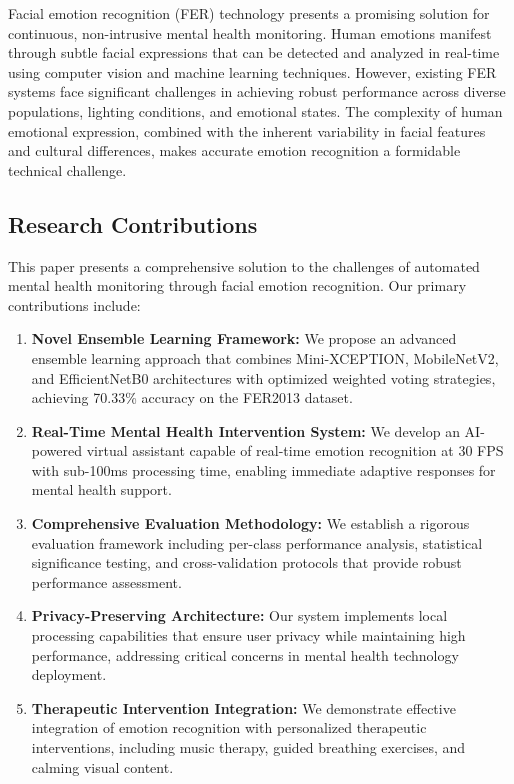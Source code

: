 \documentclass[conference]{IEEEtran}
\begin{document}
Facial emotion recognition (FER) technology presents a promising solution for continuous, non-intrusive mental health monitoring. Human emotions manifest through subtle facial expressions that can be detected and analyzed in real-time using computer vision and machine learning techniques. However, existing FER systems face significant challenges in achieving robust performance across diverse populations, lighting conditions, and emotional states. The complexity of human emotional expression, combined with the inherent variability in facial features and cultural differences, makes accurate emotion recognition a formidable technical challenge.

\subsection{Research Contributions}
This paper presents a comprehensive solution to the challenges of automated mental health monitoring through facial emotion recognition. Our primary contributions include:

\begin{enumerate}
    \item \textbf{Novel Ensemble Learning Framework:} We propose an advanced ensemble learning approach that combines Mini-XCEPTION, MobileNetV2, and EfficientNetB0 architectures with optimized weighted voting strategies, achieving 70.33\% accuracy on the FER2013 dataset.

    \item \textbf{Real-Time Mental Health Intervention System:} We develop an AI-powered virtual assistant capable of real-time emotion recognition at 30 FPS with sub-100ms processing time, enabling immediate adaptive responses for mental health support.

    \item \textbf{Comprehensive Evaluation Methodology:} We establish a rigorous evaluation framework including per-class performance analysis, statistical significance testing, and cross-validation protocols that provide robust performance assessment.

    \item \textbf{Privacy-Preserving Architecture:} Our system implements local processing capabilities that ensure user privacy while maintaining high performance, addressing critical concerns in mental health technology deployment.

    \item \textbf{Therapeutic Intervention Integration:} We demonstrate effective integration of emotion recognition with personalized therapeutic interventions, including music therapy, guided breathing exercises, and calming visual content.
\end{enumerate}
\end{document}
